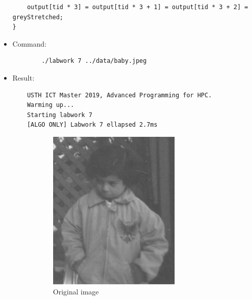 \documentclass{article}
\begin{document}
\begin{itemize}
\begin{verbatim}
    output[tid * 3] = output[tid * 3 + 1] = output[tid * 3 + 2] = greyStretched;
}
    \end{verbatim}
    \item Command:
    \begin{verbatim}
        ./labwork 7 ../data/baby.jpeg 
    \end{verbatim}
    \item Result:
    \begin{verbatim}
    USTH ICT Master 2019, Advanced Programming for HPC.
    Warming up...
    Starting labwork 7
    [ALGO ONLY] Labwork 7 ellapsed 2.7ms
    \end{verbatim}
    \begin{figure}[h]
      \centering
      \begin{subfigure}{.45\textwidth}
        \includegraphics[width=\linewidth]{./result/baby.jpg}
        \caption{Original image}
      \end{subfigure}
      \hspace{1cm}
      \begin{subfigure}{.45\textwidth}

\end{subfigure}
\end{figure}
\end{itemize}
\end{document}
